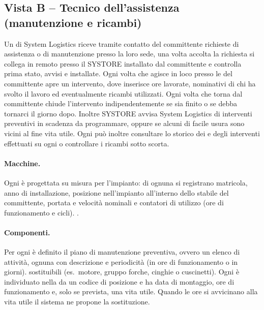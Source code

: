 \subsection{Vista B -- Tecnico dell'assistenza (manutenzione e ricambi)}
\label{sec:req-B}

Un  di System Logistics riceve tramite contatto del committente richieste di assistenza o di
manutenzione presso la loro sede, una volta accolta la richiesta si collega in remoto presso il
SYSTORE installato dal committente e controlla prima stato, avvisi e  installate. Ogni volta che
agisce in loco presso le  del committente apre un intervento, dove inserisce ore lavorate,
nominativi di chi ha svolto il lavoro ed eventualmente ricambi utilizzati. Ogni volta che torna dal
committente chiude l'intervento indipendentemente se sia finito o se debba tornarci il giorno dopo.
Inoltre SYSTORE avvisa System Logistics di interventi preventivi in scadenza da programmare, oppure
se alcuni  di facile usura sono vicini al fine vita utile.
Ogni  può inoltre consultare lo storico dei  e degli interventi effettuati su ogni
 o controllare i ricambi sotto scorta.

\paragraph{Macchine.}
Ogni  è progettata su misura per l'impianto: di ognuna si registrano matricola, anno di
installazione, posizione nell'impianto all'interno dello stabile del committente, portata e velocità
nominali e contatori di utilizzo (ore di funzionamento e cicli). .

\paragraph{Componenti.}
Per ogni  è definito il piano di manutenzione preventiva, ovvero un elenco di attività, ognuna con
descrizione e periodicità (in ore di funzionamento o in giorni).  sostituibili (es.\ motore, gruppo forche, cinghie o cuscinetti). Ogni  è
individuato nella  da un codice di posizione e ha data di montaggio, ore di funzionamento e,
solo se prevista, una vita utile. Quando le ore si avvicinano alla vita utile il sistema ne propone la
sostituzione.

